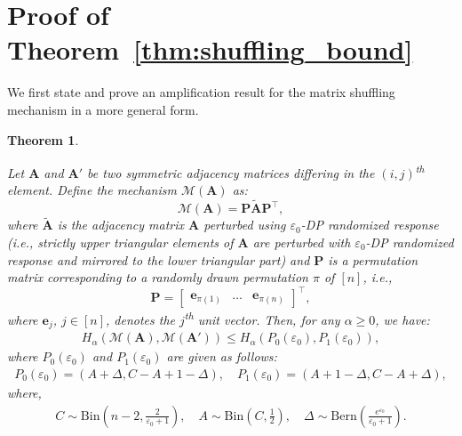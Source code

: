 \documentclass[11pt]{article}
\theoremstyle{plain}
\newtheorem{theorem}{Theorem}[section]
\theoremstyle{definition}
\theoremstyle{remark}
\newcommand{\veps}{{\varepsilon}}
\begin{document}
\section{Proof of Theorem~\ref{thm:shuffling_bound}}

We first state and prove an amplification result for the matrix shuffling mechanism in a more general form.

\begin{theorem} \label{app:thm:shuffling_bound}
    
Let $\mathbf{A}$ and $\mathbf{A}'$ be two symmetric adjacency matrices differing in the $(i,j)$\textsuperscript{th} element.
Define the mechanism $\mathcal{M}(\mathbf{A})$ as: 
$$
\mathcal{M}(\mathbf{A}) = \mathbf{P}\widetilde{\mathbf{A}}\mathbf{P}^{\top},
$$
where $\widetilde{\mathbf{A}}$ is the adjacency matrix $\mathbf{A}$ perturbed using $\veps_0$-DP randomized response (i.e., strictly upper triangular elements of $\mathbf{A}$ are perturbed with $\veps_0$-DP randomized response and mirrored to the lower triangular part) and $\mathbf{P}$ is a permutation matrix corresponding to a randomly drawn permutation $\pi$ of $[n]$, i.e.,  
$$
\mathbf{P} = \begin{bmatrix}
    \mathbf{e}_{\pi(1)} & \ldots & \mathbf{e}_{\pi(n)}
\end{bmatrix}^{\top},
$$
where $\mathbf{e}_j$, $j \in [n]$, denotes the $j$\textsuperscript{th} unit vector.
Then, for any $\alpha \geq 0$, we have:
\begin{align} \label{eq:ineq_hockey_stick_shuffling2}
H_{\alpha}\left( \mathcal{M}(\mathbf{A}) , \mathcal{M}(\mathbf{A}') \right) \leq H_{\alpha}\left( P_0\left(\veps_0\right), P_1\left(\veps_0\right) \right),
\end{align}
where $P_0(\veps_0)$ and $P_1(\veps_0)$ are given as follows:
\begin{equation} \label{eq:2n}
\begin{aligned}
P_0(\veps_0) = (A + \Delta, C-A + 1 - \Delta), \quad
P_1(\veps_0) = (A+1 - \Delta,C-A+\Delta),
\end{aligned}
\end{equation}
where,
\begin{equation*}
\begin{aligned}
	C  \sim \mathrm{Bin}\left(n-2,\frac{2}{\veps_0+1}\right), \quad A  \sim \mathrm{Bin}(C,\tfrac{1}{2}), \quad
     \Delta  \sim \mathrm{Bern}\left( \frac{e^{\veps_0}}{\veps_0+1} \right).  
\end{aligned}
\end{equation*}

\end{theorem}
\end{document}
